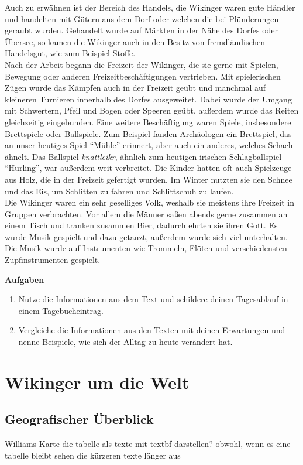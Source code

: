 \documentclass[12pt,a4paper,ngerman,openany]{book}
\newcommand{\aufgaben}[1]{
  \begin{tcolorbox}
    \textbf{Aufgaben}
    \begin{enumerate}
      #1
    \end{enumerate}
  \end{tcolorbox}
} %
\newcommand{\fchapter}[1]{\chapter{#1}\thispagestyle{chapterstyle}}
\begin{document}
Auch zu erwähnen ist der Bereich des Handels, die Wikinger waren gute Händler und handelten mit Gütern aus dem Dorf oder welchen die bei Plünderungen geraubt wurden. Gehandelt wurde auf Märkten in der Nähe des Dorfes oder Übersee, so kamen die Wikinger auch in den Besitz von fremdländischen Handelsgut, wie zum Beispiel Stoffe.\\
Nach der Arbeit begann die Freizeit der Wikinger, die sie gerne mit Spielen, Bewegung oder anderen Freizeitbeschäftigungen vertrieben.
Mit spielerischen Zügen wurde das Kämpfen auch in der Freizeit geübt und manchmal auf kleineren Turnieren innerhalb des Dorfes ausgeweitet. Dabei wurde der Umgang mit Schwertern, Pfeil und Bogen oder Speeren geübt, außerdem wurde das Reiten gleichzeitig eingebunden. Eine weitere Beschäftigung waren Spiele, insbesondere Brettspiele oder Ballspiele. Zum Beispiel fanden Archäologen ein Brettspiel, das an unser heutiges Spiel “Mühle” erinnert, aber auch ein anderes, welches Schach ähnelt. Das Ballspiel \textit{knattleikr}, ähnlich zum heutigen irischen Schlagballspiel “Hurling”, war außerdem weit verbreitet. Die Kinder hatten oft auch Spielzeuge aus Holz, die in der Freizeit gefertigt wurden. Im Winter nutzten sie den Schnee und das Eis, um Schlitten zu fahren und Schlittschuh zu laufen.\\
Die Wikinger waren ein sehr geselliges Volk, weshalb sie meistens ihre Freizeit in Gruppen verbrachten.
Vor allem die Männer saßen abends gerne zusammen an einem Tisch und tranken zusammen Bier, dadurch ehrten sie ihren Gott. Es wurde Musik gespielt und dazu getanzt, außerdem wurde sich viel unterhalten. Die Musik wurde auf Instrumenten wie Trommeln, Flöten und verschiedensten Zupfinstrumenten gespielt.


\aufgaben{
  \item Nutze die Informationen aus dem Text und schildere deinen Tagesablauf in einem Tagebucheintrag.
  \item Vergleiche die Informationen aus den Texten mit deinen Erwartungen und nenne Beispiele, wie sich der Alltag zu heute verändert hat.
}

\fchapter{Wikinger um die Welt}

\section{Geografischer Überblick}

Williams Karte
die tabelle als texte mit textbf darstellen?
obwohl, wenn es eine tabelle bleibt sehen die kürzeren texte länger aus
\end{document}

